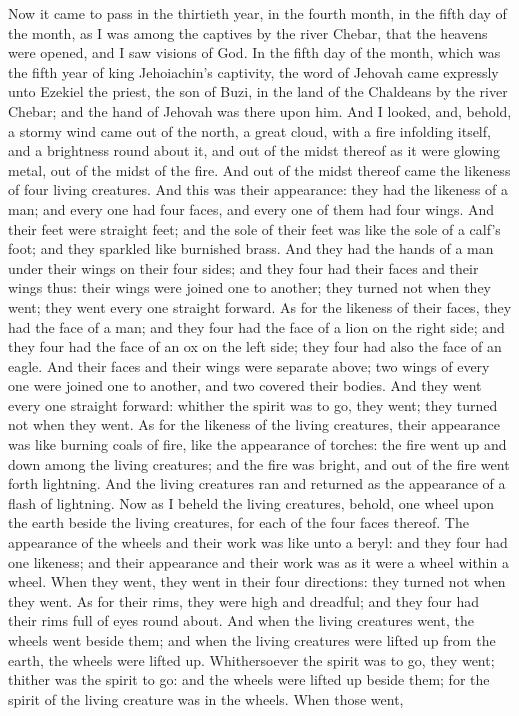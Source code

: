 


Now it came to pass in the thirtieth year, in the fourth month, in the fifth day of the month, as I was among the captives by the river Chebar, that the heavens were opened, and I saw visions of God. In the fifth day of the month, which was the fifth year of king Jehoiachin’s captivity, the word of Jehovah came expressly unto Ezekiel the priest, the son of Buzi, in the land of the Chaldeans by the river Chebar; and the hand of Jehovah was there upon him.  And I looked, and, behold, a stormy wind came out of the north, a great cloud, with a fire infolding itself, and a brightness round about it, and out of the midst thereof as it were glowing metal, out of the midst of the fire. And out of the midst thereof came the likeness of four living creatures. And this was their appearance: they had the likeness of a man; and every one had four faces, and every one of them had four wings. And their feet were straight feet; and the sole of their feet was like the sole of a calf’s foot; and they sparkled like burnished brass. And they had the hands of a man under their wings on their four sides; and they four had their faces and their wings thus: their wings were joined one to another; they turned not when they went; they went every one straight forward. As for the likeness of their faces, they had the face of a man; and they four had the face of a lion on the right side; and they four had the face of an ox on the left side; they four had also the face of an eagle. And their faces and their wings were separate above; two wings of every one were joined one to another, and two covered their bodies. And they went every one straight forward: whither the spirit was to go, they went; they turned not when they went. As for the likeness of the living creatures, their appearance was like burning coals of fire, like the appearance of torches: the fire went up and down among the living creatures; and the fire was bright, and out of the fire went forth lightning. And the living creatures ran and returned as the appearance of a flash of lightning.  Now as I beheld the living creatures, behold, one wheel upon the earth beside the living creatures, for each of the four faces thereof. The appearance of the wheels and their work was like unto a beryl: and they four had one likeness; and their appearance and their work was as it were a wheel within a wheel. When they went, they went in their four directions: they turned not when they went. As for their rims, they were high and dreadful; and they four had their rims full of eyes round about. And when the living creatures went, the wheels went beside them; and when the living creatures were lifted up from the earth, the wheels were lifted up. Whithersoever the spirit was to go, they went; thither was the spirit to go: and the wheels were lifted up beside them; for the spirit of the living creature was in the wheels. When those went, 